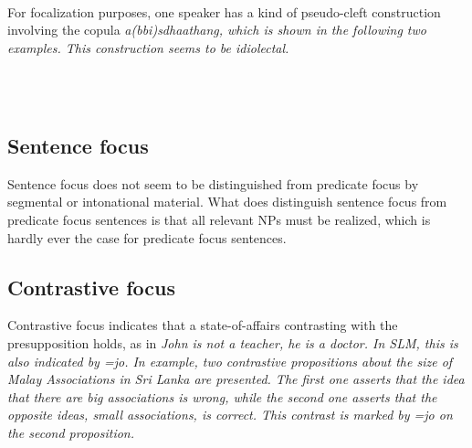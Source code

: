 \\  

For focalization purposes, one speaker has a kind of pseudo-cleft construction involving the copula \em a(bbi)sdhaathang\em, which is shown in the following two examples. This construction seems to be idiolectal.


 \\


 \\
\subsection{Sentence focus}\label{sec:disc:Sentencefocus}
Sentence focus does not seem to be distinguished from predicate focus by segmental or intonational material. What does distinguish sentence focus from predicate focus sentences is that all relevant NPs must be realized, which is hardly ever the case for predicate focus sentences. 

\subsection{Contrastive focus}\label{sec:disc:Contrastivefocus}
Contrastive focus indicates that a state-of-affairs contrasting with the presupposition holds, as in \em John is not a teacher, he is a doctor\em. In SLM, this is also indicated by \em =jo\em. In example, two contrastive propositions about the size of Malay Associations in Sri Lanka are presented. The first one asserts that the idea that there are big associations is wrong, while the second one asserts that the opposite ideas, small associations, is correct. This contrast is marked by \em =jo \em on the second proposition.


